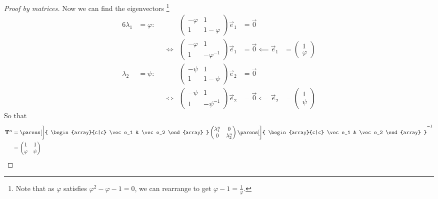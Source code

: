 \begin{proof}[Proof by matrices]
 Now we can find the eigenvectors \footnote{
     Note that as \(\varphi\) satisfies \(\varphi^2 - \varphi - 1 = 0\),
     we can rearrange to get \(\varphi - 1 = \frac 1\varphi\).}
 \begin{alignat*}6
  \lambda_1 &= \varphi\colon&
  &&
   \begin{pmatrix}
    -\varphi & 1 \\
    1 & 1 - \varphi
   \end{pmatrix} \vec e_1 &= \vec 0 \\
  && &\iff{}&
   \begin{pmatrix}
    -\varphi & 1 \\
    1 & -\varphi^{-1}
   \end{pmatrix} \vec e_1 &= \vec 0 \impliedby \vec e_1 &{}=
   \begin{pmatrix}
    1 \\
    \varphi
   \end{pmatrix} \\
  \lambda_2 &= \psi\colon&
  &&
   \begin{pmatrix}
    -\psi & 1 \\
    1 & 1 - \psi
   \end{pmatrix} \vec e_2 &= \vec 0 \\
  && &\iff{}&
   \begin{pmatrix}
    -\psi & 1 \\
    1 & -\psi^{-1}
   \end{pmatrix} \vec e_2 &= \vec 0 \impliedby \vec e_2 &{}=
   \begin{pmatrix}
    1 \\
    \psi
   \end{pmatrix}
 \end{alignat*}
 So that
 \begin{align*}
  \mat T^n &=
  \parens[\bigg]{
   \begin{array}{c|c}
    \vec e_1 & \vec e_2
   \end{array}
  }
  \begin{pmatrix}
   \lambda_1^n & 0 \\
   0 & \lambda_2^n
  \end{pmatrix}
  \parens[\bigg]{
   \begin{array}{c|c}
    \vec e_1 & \vec e_2
   \end{array}
  }^{-1} \\
  &=
  \begin{pmatrix}
   1 & 1 \\
   \varphi & \psi
  \end{pmatrix}

\end{align*}
\end{proof}
